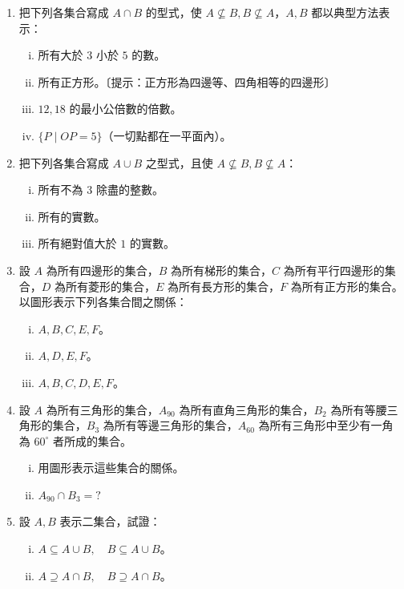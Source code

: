 \begin{enumerate}[1., leftmargin=2em]
\begin{enumerate}[(i)]
    \item $A = \{x \mid x \text{ 是等腰三角形}\}$，$B = \{x \mid x \text{ 是正三角形}\}$。
  \end{enumerate}
  \item 把下列各集合寫成 $A \cap B$ 的型式，使 $A \nsubseteq B, B \nsubseteq A$，$A, B$ 都以典型方法表示：
  \begin{enumerate}[(i)]
    \item 所有大於 $3$ 小於 $5$ 的數。
    \item 所有正方形。〔提示：正方形為四邊等、四角相等的四邊形〕
    \item $12, 18$ 的最小公倍數的倍數。
    \item $\{P \mid OP = 5\}$（一切點都在一平面內）。
  \end{enumerate}
  \item 把下列各集合寫成 $A \cup B$ 之型式，且使 $A \nsubseteq B, B \nsubseteq A$：
  \begin{enumerate}[(i)]
    \item 所有不為 $3$ 除盡的整數。
    \item 所有的實數。
    \item 所有絕對值大於 $1$ 的實數。
  \end{enumerate}
  \item 設 $A$ 為所有四邊形的集合，$B$ 為所有梯形的集合，$C$ 為所有平行四邊形的集合，$D$ 為所有菱形的集合，$E$ 為所有長方形的集合，$F$ 為所有正方形的集合。以圖形表示下列各集合間之關係：
  \begin{enumerate}[(i)]
    \item $A, B, C, E, F$。
    \item $A, D, E, F$。
    \item $A, B, C, D, E, F$。
  \end{enumerate}
  \item 設 $A$ 為所有三角形的集合，$A_{90}$ 為所有直角三角形的集合，$B_2$ 為所有等腰三角形的集合，$B_3$ 為所有等邊三角形的集合，$A_{60}$ 為所有三角形中至少有一角為 $60^\circ$ 者所成的集合。
  \begin{enumerate}[(i)]
    \item 用圖形表示這些集合的關係。
    \item $A_{90} \cap B_3 = ?$
  \end{enumerate}
  \item 設 $A, B$ 表示二集合，試證：
  \begin{enumerate}[(i)]
    \item $A \subseteq A \cup B, \quad B \subseteq A \cup B$。
    \item $A \supseteq A \cap B, \quad B \supseteq A \cap B$。

\end{enumerate}
\end{enumerate}
